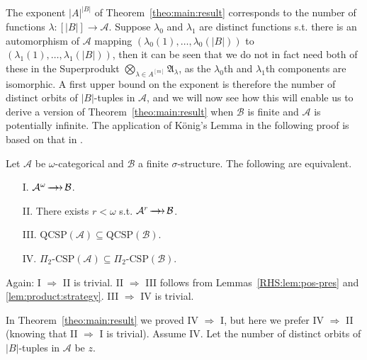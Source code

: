 \documentclass{LMCS}
\newcommand{\surhom}{
  \ensuremath{
      \negthinspace 
      \longrightarrow
      \hspace{-5mm} \rightarrow \hspace{1mm}
  }
}
\begin{document}
The exponent $|A|^{|B|}$ of Theorem~\ref{theo:main:result} corresponds to the number of functions $\lambda:[|B|]\rightarrow \mathcal{A}$. Suppose $\lambda_0$ and $\lambda_1$ are distinct functions s.t. there is an automorphism of $\mathcal{A}$ mapping $(\lambda_0(1),\ldots,\lambda_0(|B|))$ to $(\lambda_1(1),\ldots,\lambda_1(|B|))$, then it can be seen that we do not in fact need both of these in the Superprodukt $\bigotimes_{\lambda \in
  A^{[m]}} \mathfrak{A}_\lambda$, as the $\lambda_0$th and
$\lambda_1$th components are isomorphic. A first upper bound on the
exponent is therefore the number of distinct orbits of $|B|$-tuples in
$\mathcal{A}$, and we will now see how this will enable us to derive a
version of Theorem~\ref{theo:main:result} when $\mathcal{B}$ is finite
and $\mathcal{A}$ is potentially infinite. The application of
K\"onig's Lemma in the following proof is based on that in
\cite{BodirskyNesetrilJLC}.
\newpage
\begin{thm}\label{theo:omega-cat}
  Let $\mathcal{A}$ be $\omega$-categorical and $\mathcal{B}$ a finite $\sigma$-structure. The following are equivalent.
  \begin{enumerate}[label=\Roman*.]
  \item[I.] $\mathcal{A}^{\omega} \surhom \mathcal{B}$.
  \item[II.] There exists $r<\omega$ s.t. $\mathcal{A}^r \surhom \mathcal{B}$.
  \item[III.] $\mathrm{QCSP}(\mathcal{A})  \subseteq \mathrm{QCSP}(\mathcal{B})$.
  \item[IV.] $\Pi_2\mbox{-}\mathrm{CSP}(\mathcal{A})  \subseteq \Pi_2\mbox{-}\mathrm{CSP}(\mathcal{B})$.
  \end{enumerate}
\end{thm}
\proof
Again: I $\Rightarrow$ II  is trivial. II $\Rightarrow$ III follows from Lemmas~\ref{RHS:lem:pos-pres} and \ref{lem:product:strategy}. III $\Rightarrow$ IV is trivial. 

In Theorem~\ref{theo:main:result} we proved IV $\Rightarrow$ I, but here we prefer IV $\Rightarrow$ II (knowing that II $\Rightarrow$ I is trivial).  Assume IV.  Let the number of distinct orbits of $|B|$-tuples in $\mathcal{A}$ be $z$.
\end{document}
